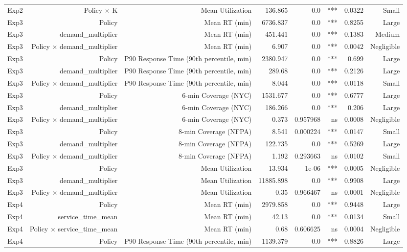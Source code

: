 \begin{table}[htbp]
\begin{tabular}{lrrrrrrr}
Exp2 & Policy × K & Mean Utilization & 136.865 & 0.0 & *** & 0.0322 & Small \\
Exp3 & Policy & Mean RT (min) & 6736.837 & 0.0 & *** & 0.8255 & Large \\
Exp3 & demand_multiplier & Mean RT (min) & 451.441 & 0.0 & *** & 0.1383 & Medium \\
Exp3 & Policy × demand_multiplier & Mean RT (min) & 6.907 & 0.0 & *** & 0.0042 & Negligible \\
Exp3 & Policy & P90 Response Time (90th percentile, min) & 2380.947 & 0.0 & *** & 0.699 & Large \\
Exp3 & demand_multiplier & P90 Response Time (90th percentile, min) & 289.68 & 0.0 & *** & 0.2126 & Large \\
Exp3 & Policy × demand_multiplier & P90 Response Time (90th percentile, min) & 8.044 & 0.0 & *** & 0.0118 & Small \\
Exp3 & Policy & 6-min Coverage (NYC) & 1531.677 & 0.0 & *** & 0.6777 & Large \\
Exp3 & demand_multiplier & 6-min Coverage (NYC) & 186.266 & 0.0 & *** & 0.206 & Large \\
Exp3 & Policy × demand_multiplier & 6-min Coverage (NYC) & 0.373 & 0.957968 & ns & 0.0008 & Negligible \\
Exp3 & Policy & 8-min Coverage (NFPA) & 8.541 & 0.000224 & *** & 0.0147 & Small \\
Exp3 & demand_multiplier & 8-min Coverage (NFPA) & 122.735 & 0.0 & *** & 0.5269 & Large \\
Exp3 & Policy × demand_multiplier & 8-min Coverage (NFPA) & 1.192 & 0.293663 & ns & 0.0102 & Small \\
Exp3 & Policy & Mean Utilization & 13.934 & 1e-06 & *** & 0.0005 & Negligible \\
Exp3 & demand_multiplier & Mean Utilization & 11885.898 & 0.0 & *** & 0.9908 & Large \\
Exp3 & Policy × demand_multiplier & Mean Utilization & 0.35 & 0.966467 & ns & 0.0001 & Negligible \\
Exp4 & Policy & Mean RT (min) & 2979.858 & 0.0 & *** & 0.9448 & Large \\
Exp4 & service_time_mean & Mean RT (min) & 42.13 & 0.0 & *** & 0.0134 & Small \\
Exp4 & Policy × service_time_mean & Mean RT (min) & 0.68 & 0.606625 & ns & 0.0004 & Negligible \\
Exp4 & Policy & P90 Response Time (90th percentile, min) & 1139.379 & 0.0 & *** & 0.8826 & Large \\

\end{tabular}
\end{table}
